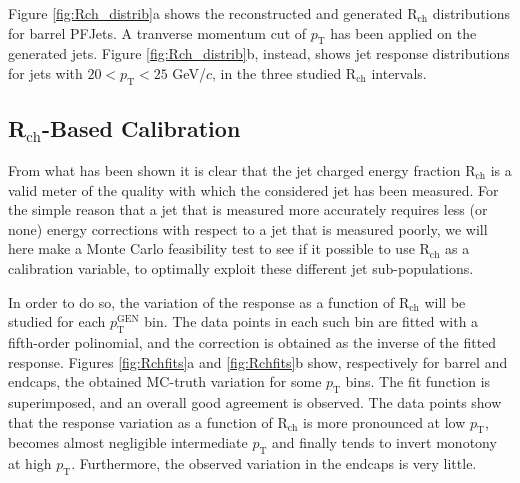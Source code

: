 \documentclass{cmspaper}
\begin{document}
Figure \ref{fig:Rch_distrib}a shows the reconstructed and generated R$_{\mathrm{ch}}$ distributions for barrel PFJets. A tranverse momentum cut of $p_{\mathrm{T}}$ has been applied on the generated jets. Figure \ref{fig:Rch_distrib}b, instead, shows jet response distributions for jets with $20<p_{\mathrm{T}}<25$ GeV/$c$, in the three studied R$_{\mathrm{ch}}$ intervals.


\subsection{R$_{\mathrm{ch}}$-Based Calibration}

From what has been shown it is clear that the jet charged energy fraction R$_{\mathrm{ch}}$ is a valid meter of the quality with which the considered jet has been measured. For the simple reason that a jet that is measured more accurately requires less (or none) energy corrections with respect to a jet that is measured poorly, we will here make a Monte Carlo feasibility test to see if it possible to use R$_{\mathrm{ch}}$ as a calibration variable, to optimally exploit these different jet sub-populations.

In order to do so, the variation of the response as a function of R$_{\mathrm{ch}}$ will be studied for each $p_{\mathrm{T}}^{\mathrm{GEN}}$ bin. The data points in each such bin are fitted with a fifth-order polinomial, and the correction is obtained as the inverse of the fitted response. Figures \ref{fig:Rchfits}a and \ref{fig:Rchfits}b show, respectively for barrel and endcaps, the obtained MC-truth variation for some $p_{\mathrm{T}}$ bins. The fit function is superimposed, and an overall good agreement is observed. The data points show that the response variation as a function of R$_{\mathrm{ch}}$ is more pronounced at low $p_{\mathrm{T}}$, becomes almost negligible  intermediate $p_{\mathrm{T}}$ and finally tends to invert monotony at high $p_{\mathrm{T}}$. Furthermore, the observed variation in the endcaps is very little.

\end{document}
